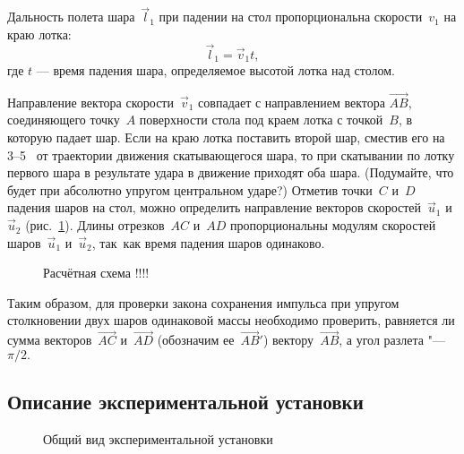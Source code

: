 \documentclass[a4paper, 12pt]{extarticle}
\begin{document}
Дальность полета шара~$\vec l_1$ при падении на стол пропорциональна скорости~$v_1$ на краю лотка:
\[
\vec l_1 = \vec v_1 t,
\]
где $t$ --- время падения шара, определяемое высотой лотка над столом.

Направление вектора скорости~$\vec v_1$ совпадает с направлением вектора $\vec{AB}$, соединяющего точку~$A$ поверхности стола под краем лотка с точкой~$B$, в которую падает шар. Если на краю лотка поставить второй шар, сместив его на 3--5~ от траектории движения скатывающегося шара, то при скатывании по лотку первого шара в результате удара в движение приходят оба шара. (Подумайте, что будет при абсолютно упругом центральном ударе?) Отметив точки~$C$ и~$D$ падения шаров на стол, можно определить направление векторов скоростей~$\vec u_1$ и~$\vec u_2$ (рис.~\ref{fig:m4-impulse-diagram}). Длины отрезков~$AC$ и~$AD$ пропорциональны модулям скоростей шаров~$\vec u_1$ и~$\vec u_2$, так~как время падения шаров одинаково. %

\begin{figure}[b]
\begin{center}
\end{center}
\caption{Расчётная схема \Huge !!!!\label{fig:m4-impulse-diagram}}
\end{figure}

Таким образом, для проверки закона сохранения импульса при упругом столкновении двух шаров одинаковой массы необходимо проверить, равняется ли сумма векторов~$\vec{AC}$ и~$\vec{AD}$ (обозначим ее~$\vec{AB}'$) вектору~$\vec{AB}$, а угол разлета "--- $\pi/2.$

\subsection{Описание экспериментальной установки}

\begin{figure}[b]
\begin{center}
\end{center}
\caption{Общий вид экспериментальной установки \label{fig:m4-equipment}}
\end{figure} %
\end{document}
